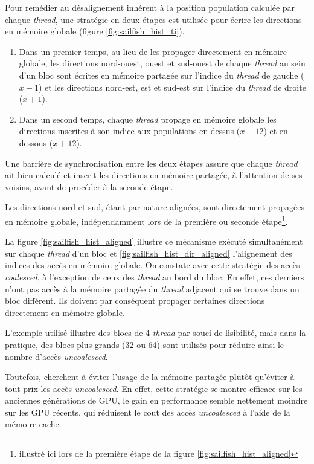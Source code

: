 Pour remédier au désalignement inhérent à la position population calculée par chaque \textit{thread}, une stratégie en deux étapes est utilisée pour écrire les directions en mémoire globale (figure \ref{fig:sailfish_hist_ti}). 
\begin{enumerate}
\item Dans un premier temps, au lieu de les propager directement en mémoire globale, les directions nord-ouest, ouest et sud-ouest de chaque \textit{thread} au sein d'un bloc sont écrites en mémoire partagée sur l'indice du \textit{thread} de gauche ($x-1$) et les directions nord-est, est et sud-est sur l'indice du \textit{thread} de droite ($x+1$).
\item Dans un second temps, chaque \textit{thread} propage en mémoire globale les directions inscrites à son indice aux populations en dessus ($x - 12$) et en dessous ($x + 12$).
\end{enumerate}
Une barrière de synchronisation entre les deux étapes assure que chaque \textit{thread} ait bien calculé et inscrit les directions en mémoire partagée, à l'attention de ses voisins, avant de procéder à la seconde étape.

Les directions nord et sud, étant par nature alignées, sont directement propagées en mémoire globale, indépendamment lors de la première ou seconde étape\footnote{illustré ici lors de la première étape de la figure \ref{fig:sailfish_hist_aligned}}. 

La figure \ref{fig:sailfish_hist_aligned} illustre ce mécanisme exécuté simultanément sur chaque \textit{thread} d'un bloc et \ref{fig:sailfish_hist_dir_aligned} l'alignement des indices des accès en mémoire globale. On constate avec cette stratégie des accès \textit{coalesced}, à l'exception de ceux des \textit{thread} au bord du bloc. En effet, ces derniers n'ont pas accès à la mémoire partagée du \textit{thread} adjacent qui se trouve dans un bloc différent. Ils doivent par conséquent propager certaines directions directement en mémoire globale.

L'exemple utilisé illustre des blocs de 4 \textit{thread} par souci de lisibilité, mais dans la pratique, des blocs plus grands (32 ou 64) sont utilisés pour réduire ainsi le nombre d'accès \textit{uncoalesced}.

Toutefois, \citet{obrecht_global_2011} cherchent à éviter l'usage de la mémoire partagée plutôt qu'éviter à tout prix les accès \textit{uncoalesced}. En effet, cette stratégie se montre efficace sur les anciennes générations de \acs{GPU}, le gain en performance semble nettement moindre sur les \acs{GPU} récents, qui réduisent le cout des accès \textit{uncoalesced} à l'aide de la mémoire cache. 


